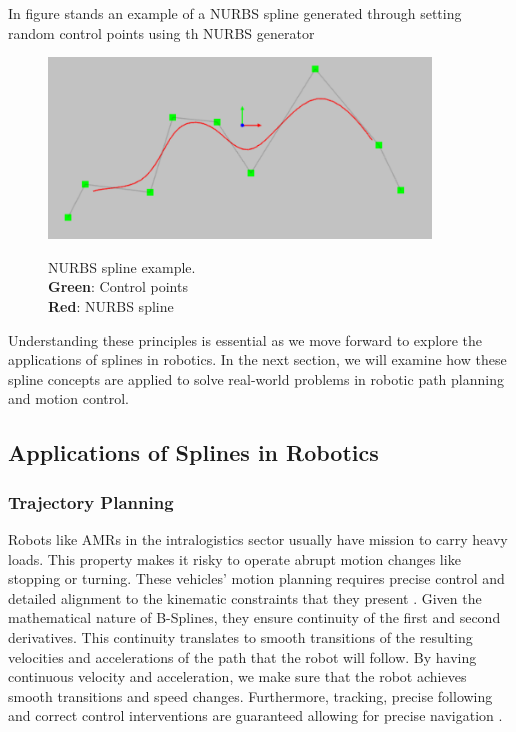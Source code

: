 In figure  stands an example of a NURBS spline generated through setting random 
control points using th NURBS generator \cite{R32}

\begin{figure}[H]
    \begin{center}
    \includegraphics[width=4in]{images/Chap1/control-spline.png}\\
    \caption{NURBS spline example.\\
    \textbf{Green}: Control points\\
    \textbf{Red}: NURBS spline}
    \label{NURBS} 
    \end{center}
\end{figure}

Understanding these principles is essential as we move forward to explore the applications of splines 
in robotics. In the next section, we will examine how these spline concepts are applied to solve 
real-world problems in robotic path planning and motion control.

\subsection{Applications of Splines in Robotics}
\subsubsection{Trajectory Planning} 
Robots like AMRs in the intralogistics sector usually have mission to carry heavy loads. 
This property makes it risky to operate abrupt motion changes like stopping or turning.
These vehicles' motion planning requires precise control and detailed alignment to the 
kinematic constraints that they present \cite{R30}.
Given the mathematical nature of B-Splines, they ensure continuity of the first and second derivatives.
This continuity translates to smooth transitions of the resulting velocities and accelerations of the path
that the robot will follow. By having continuous velocity and acceleration, we make sure that the robot
achieves smooth transitions and speed changes. Furthermore, tracking, precise following and correct control
interventions are guaranteed allowing for precise navigation \cite{R30}. 

